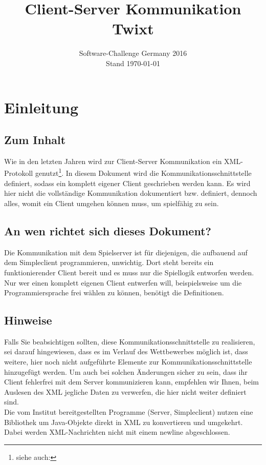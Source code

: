 \documentclass[12pt,a4paper, ngerman, oneside]{scrartcl}
\date{Software-Challenge Germany 2016\\Stand \today}
\title{Client-Server Kommunikation Twixt}
\begin{document}
\maketitle
\thispagestyle{empty}
\tableofcontents
\thispagestyle{empty}
\newpage
\setcounter{page}{1}
\section{Einleitung}
\subsection*{Zum Inhalt} Wie in den letzten Jahren wird zur Client-Server
Kommunikation ein XML-Protokoll genutzt\footnote{siehe auch:
}. In diesem
Dokument wird die Kommunikationsschnittstelle definiert, sodass ein komplett
eigener Client geschrieben werden kann. Es wird hier nicht die vollst\"andige
Kommunikation dokumentiert bzw. definiert, dennoch alles, womit ein Client
umgehen k\"onnen muss, um spielf\"ahig zu sein.
\subsection*{An wen richtet sich dieses Dokument?} Die Kommunikation mit dem
Spielserver ist f\"ur diejenigen, die aufbauend auf dem Simpleclient
programmieren, unwichtig. Dort steht bereits ein funktionierender Client bereit
und es muss nur die Spiellogik entworfen werden. \\
Nur wer einen komplett eigenen Client entwerfen will, beispielsweise um die
Programmiersprache frei w\"ahlen zu k\"onnen, ben\"otigt die Definitionen.

\subsection*{Hinweise} Falls Sie beabsichtigen sollten, diese
Kommunikationsschnittstelle zu realisieren, sei darauf hingewiesen, dass es im
Verlauf des Wettbewerbes m\"oglich ist, dass weitere, hier noch nicht aufgef\"uhrte
Elemente zur Kommunikationsschnittstelle hinzugef\"ugt werden. Um auch bei
solchen \"Anderungen sicher zu sein, dass ihr Client fehlerfrei mit dem Server
kommunizieren kann, empfehlen wir Ihnen, beim Auslesen des XML jegliche Daten zu
verwerfen, die hier nicht weiter definiert sind. \bigskip \\
Die vom Institut bereitgestellten Programme (Server, Simpleclient) nutzen eine
Bibliothek um Java-Objekte direkt in XML zu konvertieren und umgekehrt. 
Dabei werden XML-Nachrichten nicht mit einem newline abgeschlossen.
\end{document}
